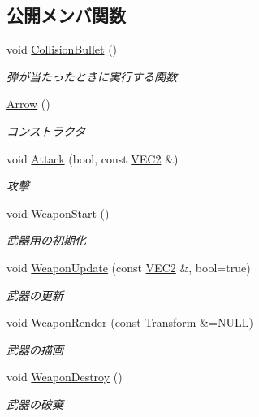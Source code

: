 \subsection*{公開メンバ関数}
\begin{DoxyCompactItemize}
\item 
void \mbox{\hyperlink{class_arrow_afe567fd69597c0a5c44edd99c06d6f71}{Collision\+Bullet}} ()
\begin{DoxyCompactList}\small\item\em 弾が当たったときに実行する関数 \end{DoxyCompactList}\item 
\mbox{\hyperlink{class_arrow_a34acd71904bf918ca11ebe9208739a4c}{Arrow}} ()
\begin{DoxyCompactList}\small\item\em コンストラクタ \end{DoxyCompactList}\item 
void \mbox{\hyperlink{class_arrow_ab2571579c0183f4db62bc1c4f9fc68f3}{Attack}} (bool, const \mbox{\hyperlink{common_8h_afb0c5e21d4133ff4f200992c0b534e1b}{V\+E\+C2}} \&)
\begin{DoxyCompactList}\small\item\em 攻撃 \end{DoxyCompactList}\item 
void \mbox{\hyperlink{class_arrow_a0bdc2c0f450a1c6f4d38e49fdfd60a88}{Weapon\+Start}} ()
\begin{DoxyCompactList}\small\item\em 武器用の初期化 \end{DoxyCompactList}\item 
void \mbox{\hyperlink{class_arrow_a00f34c3153e0b2dc50259b8a249ee8ad}{Weapon\+Update}} (const \mbox{\hyperlink{common_8h_afb0c5e21d4133ff4f200992c0b534e1b}{V\+E\+C2}} \&, bool=true)
\begin{DoxyCompactList}\small\item\em 武器の更新 \end{DoxyCompactList}\item 
void \mbox{\hyperlink{class_arrow_a30553702b80c0559705a17d92389a1fc}{Weapon\+Render}} (const \mbox{\hyperlink{class_transform}{Transform}} \&=N\+U\+LL)
\begin{DoxyCompactList}\small\item\em 武器の描画 \end{DoxyCompactList}\item 
void \mbox{\hyperlink{class_arrow_a6b9bfb7bf580c147e61d111b3cb2b293}{Weapon\+Destroy}} ()
\begin{DoxyCompactList}\small\item\em 武器の破棄 \end{DoxyCompactList}\end{DoxyCompactItemize}


